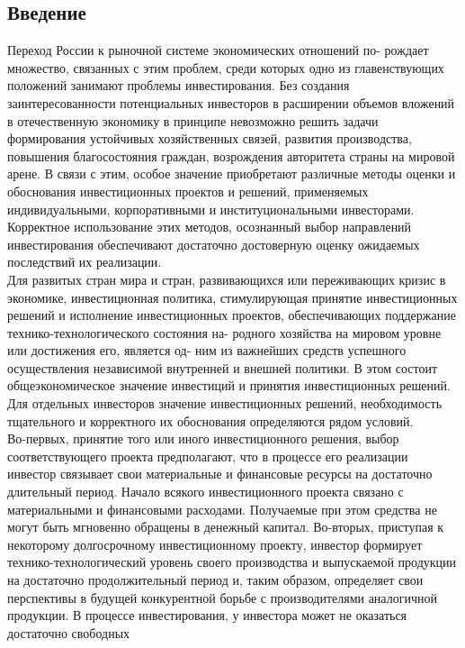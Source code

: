 \documentclass[a4paper,12pt]{article}
\begin{document}
		\subsection{Введение}
		Переход России к рыночной системе экономических отношений по-
рождает множество, связанных с этим проблем, среди которых одно из
главенствующих положений занимают проблемы инвестирования. Без
создания заинтересованности потенциальных инвесторов в расширении
объемов вложений в отечественную экономику в принципе невозможно
решить задачи формирования устойчивых хозяйственных связей, развития
производства, повышения благосостояния граждан, возрождения авторитета страны на мировой арене. В связи с этим, особое значение приобретают различные методы оценки и обоснования инвестиционных проектов
и решений, применяемых индивидуальными, корпоративными и институциональными инвесторами. Корректное использование этих методов,
осознанный выбор направлений инвестирования обеспечивают достаточно достоверную оценку ожидаемых последствий их реализации.\\
Для развитых стран мира и стран, развивающихся или переживающих кризис в экономике, инвестиционная политика, стимулирующая принятие инвестиционных решений и исполнение инвестиционных проектов,
обеспечивающих поддержание технико-технологического состояния на-
родного хозяйства на мировом уровне или достижения его, является од-
ним из важнейших средств успешного осуществления независимой внутренней и внешней политики. В этом состоит общеэкономическое значение
инвестиций и принятия инвестиционных решений.\\
Для отдельных инвесторов значение инвестиционных решений, необходимость тщательного и корректного их обоснования определяются
рядом условий.\\
Во-первых, принятие того или иного инвестиционного решения, выбор соответствующего проекта предполагают, что в процессе его реализации инвестор связывает свои материальные и финансовые ресурсы на достаточно длительный период. Начало всякого инвестиционного проекта
связано с материальными и финансовыми расходами. Получаемые при
этом средства не могут быть мгновенно обращены в денежный капитал.
Во-вторых, приступая к некоторому долгосрочному инвестиционному проекту, инвестор формирует технико-технологический уровень своего
производства и выпускаемой продукции на достаточно продолжительный
период и, таким образом, определяет свои перспективы в будущей конкурентной борьбе с производителями аналогичной продукции. В процессе
инвестирования, у инвестора может не оказаться достаточно свободных
\end{document}
